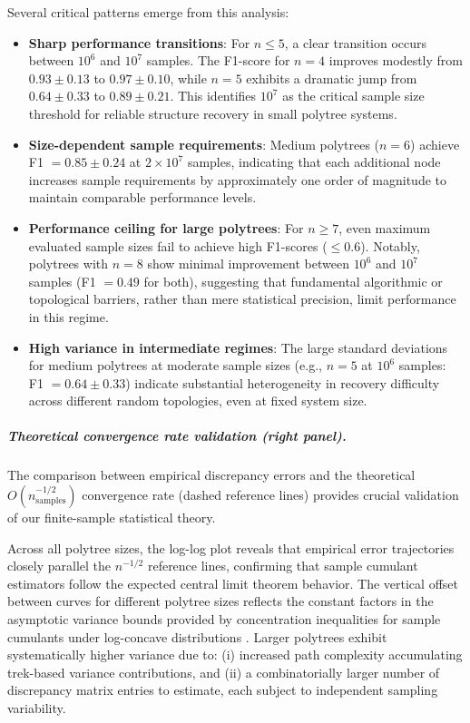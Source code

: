 \documentclass[11pt,a4paper]{article}
\numberwithin{equation}{section}
\begin{document}
Several critical patterns emerge from this analysis:

\begin{itemize}
\item \textbf{Sharp performance transitions}: For $n \leq 5$, a clear transition occurs between $10^6$ and $10^7$ samples. The F1-score for $n=4$ improves modestly from $0.93 \pm 0.13$ to $0.97 \pm 0.10$, while $n=5$ exhibits a dramatic jump from $0.64 \pm 0.33$ to $0.89 \pm 0.21$. This identifies $10^7$ as the critical sample size threshold for reliable structure recovery in small polytree systems.

\item \textbf{Size-dependent sample requirements}: Medium polytrees ($n=6$) achieve F1 $= 0.85 \pm 0.24$ at $2 \times 10^7$ samples, indicating that each additional node increases sample requirements by approximately one order of magnitude to maintain comparable performance levels.

\item \textbf{Performance ceiling for large polytrees}: For $n \geq 7$, even maximum evaluated sample sizes fail to achieve high F1-scores ($\leq 0.6$). Notably, polytrees with $n=8$ show minimal improvement between $10^6$ and $10^7$ samples (F1 $= 0.49$ for both), suggesting that fundamental algorithmic or topological barriers, rather than mere statistical precision, limit performance in this regime.

\item \textbf{High variance in intermediate regimes}: The large standard deviations for medium polytrees at moderate sample sizes (e.g., $n=5$ at $10^6$ samples: F1 $= 0.64 \pm 0.33$) indicate substantial heterogeneity in recovery difficulty across different random topologies, even at fixed system size.
\end{itemize}

\subparagraph{Theoretical convergence rate validation (right panel).} The comparison between empirical discrepancy errors and the theoretical $O(n_{\text{samples}}^{-1/2})$ convergence rate (dashed reference lines) provides crucial validation of our finite-sample statistical theory.

Across all polytree sizes, the log-log plot reveals that empirical error trajectories closely parallel the $n^{-1/2}$ reference lines, confirming that sample cumulant estimators follow the expected central limit theorem behavior. The vertical offset between curves for different polytree sizes reflects the constant factors in the asymptotic variance bounds provided by concentration inequalities for sample cumulants under log-concave distributions \citep[Cor.~4.1]{tramontano:monod:drton:2022}. Larger polytrees exhibit systematically higher variance due to: (i) increased path complexity accumulating trek-based variance contributions, and (ii) a combinatorially larger number of discrepancy matrix entries to estimate, each subject to independent sampling variability.
\end{document}
